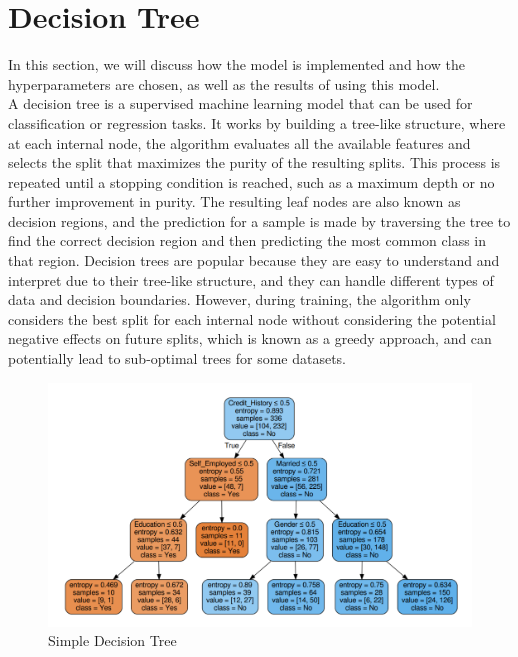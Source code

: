 \section{Decision Tree}
In this section, we will discuss how the  model is implemented and how the hyperparameters are chosen, as well as the results of using this model.\\

A decision tree is a supervised machine learning model that can be used for classification or regression tasks.
It works by building a tree-like structure, where at each internal node, the algorithm evaluates all the available features and selects the split that maximizes the purity of the resulting splits.
This process is repeated until a stopping condition is reached, such as a maximum depth or no further improvement in purity.
The resulting leaf nodes are also known as decision regions, and the prediction for a sample is made by traversing the tree to find the correct decision region and then predicting the most common class in that region.
Decision trees are popular because they are easy to understand and interpret due to their tree-like structure, and they can handle different types of data and decision boundaries.
However, during training, the algorithm only considers the best split for each internal node without considering the potential negative effects on future splits, which is known as a greedy approach, and can potentially lead to sub-optimal trees for some datasets.

\begin{figure}[H]
    \centering
    \includegraphics[scale=0.25]{figures_for_report/example_decision_tree}
    \captionsetup{justification=centering,margin=2cm}
    \caption{Simple Decision Tree}
\end{figure}


